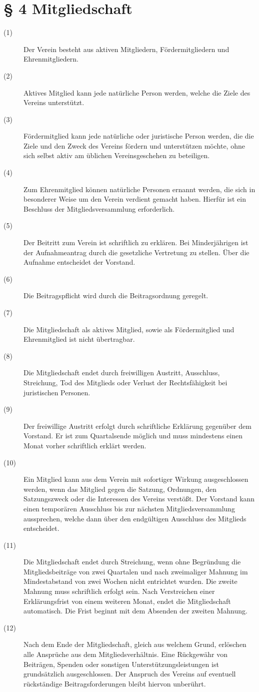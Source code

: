 \documentclass[a4paper,12pt]{scrartcl}
\begin{document}
\section*{\S{} 4 Mitgliedschaft}
\begin{description} 

\item[(1)] Der Verein besteht aus aktiven Mitgliedern, Fördermitgliedern und Ehrenmitgliedern.
\item[(2)] Aktives Mitglied kann jede natürliche Person werden, welche die Ziele des Vereins unterstützt.
\item[(3)] Fördermitglied kann jede natürliche oder juristische Person werden, die die Ziele und den Zweck des Vereins fördern und unterstützen möchte, ohne sich selbst aktiv am üblichen Vereinsgeschehen zu beteiligen.
\item[(4)] Zum Ehrenmitglied können natürliche Personen ernannt werden, die sich in besonderer Weise um den Verein verdient gemacht haben. Hierfür ist ein Beschluss der Mitgliedsversammlung erforderlich.
\item[(5)] Der Beitritt zum Verein ist schriftlich zu erklären. Bei Minderjährigen ist der Aufnahmeantrag durch die gesetzliche Vertretung zu stellen. Über die Aufnahme entscheidet der Vorstand.
\item[(6)] Die Beitragspflicht wird durch die Beitragsordnung geregelt.
\item[(7)] Die Mitgliedschaft als aktives Mitglied, sowie als Fördermitglied und Ehrenmitglied ist nicht übertragbar. 
\item[(8)] Die Mitgliedschaft endet durch freiwilligen Austritt, Ausschluss, Streichung, Tod des Mitglieds oder Verlust der Rechtsfähigkeit bei juristischen Personen. 
\item[(9)] Der freiwillige Austritt erfolgt durch schriftliche Erklärung gegenüber dem Vorstand. Er ist zum Quartalsende möglich und muss mindestens einen Monat vorher schriftlich erklärt werden. 
\item[(10)] Ein Mitglied kann aus dem Verein mit sofortiger Wirkung ausgeschlossen werden, wenn das Mitglied gegen die Satzung, Ordnungen, den Satzungszweck oder die Interessen des Vereins verstößt. Der Vorstand kann einen temporären Ausschluss bis zur nächsten Mitgliedsversammlung aussprechen, welche dann über den endgültigen Ausschluss des Mitglieds entscheidet. 
\item[(11)] Die Mitgliedschaft endet durch Streichung, wenn ohne Begründung die Mitgliedsbeiträge von zwei Quartalen und nach zweimaliger Mahnung im Mindestabstand von zwei Wochen nicht entrichtet wurden. Die zweite Mahnung muss schriftlich erfolgt sein. Nach Verstreichen einer Erklärungsfrist von einem weiteren Monat, endet die Mitgliedschaft automatisch. Die Frist beginnt mit dem Absenden der zweiten Mahnung. 
\item[(12)] Nach dem Ende der Mitgliedschaft, gleich aus welchem Grund, erlöschen alle Ansprüche aus dem Mitgliedsverhältnis. Eine Rückgewähr von Beiträgen, Spenden oder sonstigen Unterstützungsleistungen ist grundsätzlich ausgeschlossen. Der Anspruch des Vereins auf eventuell rückständige Beitragsforderungen bleibt hiervon unberührt.


\end{description}
\end{document}
